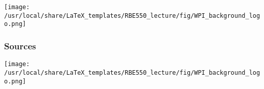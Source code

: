 
\begin{frame}[label=finalframe]
 

\begin{center}
\texttt{[image: /usr/local/share/LaTeX\_templates/RBE550\_lecture/fig/WPI\_background\_logo.png]}
\end{center}

\end{frame}

\begin{frame}[allowframebreaks,label=bibliography]
    \frametitle{Sources}

    
    

\end{frame}



\begin{frame}[label=finalframe]
 

\begin{center}
\texttt{[image: /usr/local/share/LaTeX\_templates/RBE550\_lecture/fig/WPI\_background\_logo.png]}
\end{center}

\end{frame}

 


